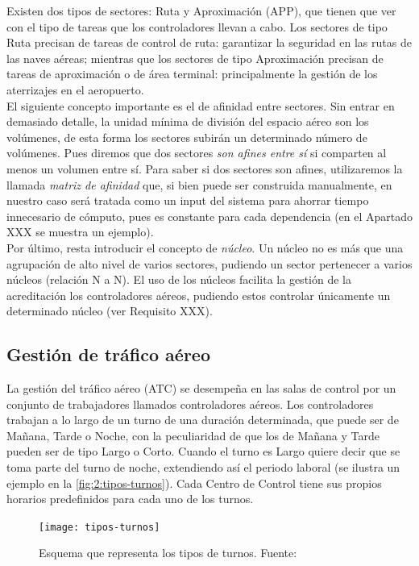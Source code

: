 Existen dos tipos de sectores: Ruta y Aproximación (APP), que tienen que ver con el tipo de tareas que los 
controladores llevan a cabo.
Los sectores de tipo Ruta precisan de tareas de control de ruta: garantizar la seguridad en las rutas de las naves aéreas; mientras que los sectores de tipo Aproximación precisan de tareas de aproximación o de área terminal: principalmente la gestión de los aterrizajes en el aeropuerto.
\\

El siguiente concepto importante es el de afinidad entre sectores. Sin entrar en demasiado detalle, la unidad mínima de división del espacio aéreo son los volúmenes, de esta forma los sectores subirán un determinado número de volúmenes.
Pues diremos que dos sectores \textit{son afines entre sí} si comparten al menos un volumen entre sí. Para saber si dos sectores son afines, utilizaremos la llamada \textit{matriz de afinidad} que, si bien puede ser construida manualmente, en nuestro caso será tratada como un input del sistema para ahorrar tiempo innecesario de cómputo, pues es constante para cada dependencia (en el Apartado XXX se muestra un ejemplo). %
\\

Por último, resta introducir el concepto de \textit{núcleo}. Un núcleo no es más que una agrupación de alto nivel de varios sectores, pudiendo un sector pertenecer a varios núcleos (relación N a N). El uso de los núcleos facilita la gestión de la acreditación los controladores aéreos, pudiendo estos controlar únicamente un determinado núcleo (ver Requisito XXX). %


\subsection{Gestión de tráfico aéreo}
La gestión del tráfico aéreo (\gls{ATC}) se desempeña en las salas de control por un conjunto de trabajadores 
llamados controladores aéreos. Los controladores trabajan a lo largo de un turno de una duración determinada, que puede ser de Mañana, Tarde o Noche, con la peculiaridad de que los de Mañana y Tarde pueden ser de tipo Largo o Corto. 
Cuando el turno es Largo quiere decir que se toma parte del turno de noche, extendiendo así el periodo laboral (se ilustra un ejemplo en la \autoref{fig:2:tipos-turnos}). Cada \acrlong{Centro de Control} tiene sus propios horarios predefinidos para cada uno de los turnos.
\\

\begin{figure}
	\centering
	\texttt{[image: tipos-turnos]}
	\caption[Esquema que representa los tipos de turnos]{Esquema que representa los tipos de turnos. 
	Fuente:~\cite{articulo1}}
	\label{fig:2:tipos-turnos}
\end{figure}

